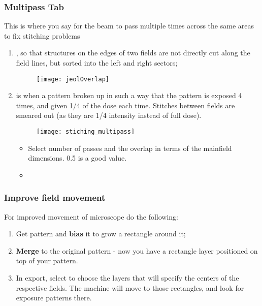   \subsubsection{Multipass Tab}
  This is  where you say for  the beam to pass  multiple times across
  the same areas to fix stitching problems
  \begin{enumerate}
  \item {},  so that structures on the  edges of two
    fields are  not directly  cut along the  field lines,  but sorted
    into the left and right sectors;

\begin{figure}[h]
  \centering \texttt{[image: jeolOverlap]}
\end{figure}

\noindent
\item {} is when  a pattern
  broken up in  such a way that  the pattern is exposed  4 times, and
  given  1/4 of  the dose  each  time.  Stitches  between fields  are
  smeared out (as they are 1/4 intensity instead of full dose).

\begin{figure}[h]
  \centering \texttt{[image: stiching\_multipass]}
\end{figure}

\noindent
\begin{itemize}
\item  Select number  of  passes  and the  overlap  in  terms of  the
  mainfield dimensions. 0.5 is a good value.
\item  {}
\end{itemize}
\end{enumerate}

\subsubsection{Improve field movement}
\label{sec:impr-field-movem}
For improved movement of microscope do the following:
\begin{enumerate}
\item Get pattern and \textbf{bias} it to grow a rectangle around it;
\item  \textbf{Merge}  to the  original  pattern  -  now you  have  a
  rectangle layer positioned on top of your pattern.
\item  In export,  select   to choose  the
  layers that will specify the centers of the respective fields.  The
  machine  will  move to  those  rectangles,  and look  for  exposure
  patterns there.
\end{enumerate}


